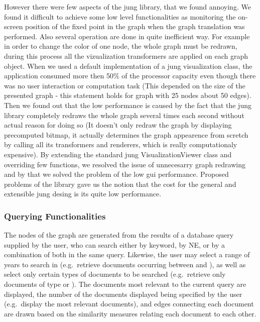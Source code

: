 However there were few aspects of the jung library, that we found annoying. We found it difficult to achieve some low level functionalities as monitoring the on-screen position of the fixed point in the graph when the graph translation was performed. Also several operation are done in quite inefficient way. For example in order to change the color of one node, the whole graph must be redrawn, during this process all the vizualization transformers are applied on each graph object. When we used a default implementation of a jung visualization class, the application consumed more then 50\% of the processor capacity even though there was no user interaction or computation task (This depended on the size of the presented graph - this statement holds for graph with 25 nodes about 50 edges). Then we found out that the low performance is caused by the fact that the jung library completely redraws the whole graph several times each second without actual reason for doing so (It doesn't only redraw the graph by displaying precomputed bitmap, it actually determines the graph appearence from scretch by calling all its transformers and renderers, which is really computationaly expensive). By extending the standard jung VisualizationViewer class and overriding few functions, we resolved the issue of unnecesarry graph redrawing and by that we solved the problem of the low gui performance. Proposed problems of the library gave us the notion that the cost for the general and extensible jung desing is its quite low performance.

\subsubsection {Querying Functionalities}
\label{sec:querying_functionalities}
The nodes of the graph are generated from the results of a database query supplied by the user, who can search either by keyword, by NE, or by a combination of both in the same query. Likewise, the user may select a range of years to search in (e.g.\ retrieve documents occurring between  and ), as well as select only certain types of documents to be searched (e.g.\ retrieve only documents of type  or ). The documents most relevant to the current query are displayed, the number of the documents displayed being specified by the user (e.g.\ display the  most relevant documents), and edges connecting each document are drawn based on the similarity measures relating each document to each other.

